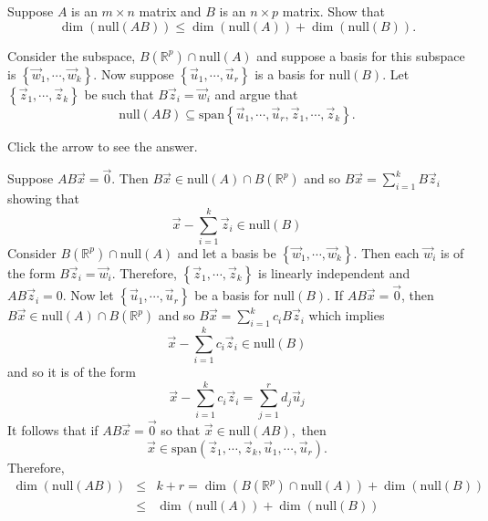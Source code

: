 \documentclass{ximera}
\begin{document}
\begin{problem}\label{prb:5.30} Suppose $A$ is an $m\times n$ matrix and $B$ is an $n\times p$ matrix.
Show that
\begin{equation*}
\dim \left( \mbox{null} \left( AB\right) \right) \leq \dim \left( \mbox{null} \left(
A\right) \right) +\dim \left( \mbox{null} \left( B\right) \right) .
\end{equation*}
\begin{hint}
Consider the subspace, $B\left( \mathbb{R}^{p}\right) \cap
\mbox{null} \left( A\right) $ and suppose a basis for this subspace is $\left\{
\vec{w}_{1},\cdots ,\vec{w}_{k}\right\} .$ Now suppose $\left\{
\vec{u}_{1},\cdots ,\vec{u}_{r}\right\} $ is a basis for $\mbox{null} \left(
B\right) .$ Let $\left\{ \vec{z}_{1},\cdots ,\vec{z}_{k}\right\} $ be
such that $B\vec{z}_{i}=\vec{w}_{i}$ and argue that
\begin{equation*}
\mbox{null} \left( AB\right) \subseteq \mbox{span}\left\{ \vec{u}_{1},\cdots ,
\vec{u}_{r},\vec{z}_{1},\cdots ,\vec{z}_{k}\right\} .
\end{equation*}

Click the arrow to see the answer.
\begin{expandable}
Suppose $AB\vec{x}=\vec{0}.$ Then $B\vec{x}\in \mbox{null}
\left( A\right) \cap B\left( \mathbb{R}^{p}\right) $ and so $B\vec{x}
=\sum_{i=1}^{k}B\vec{z}_{i}$ showing that
\[
\vec{x}-\sum_{i=1}^{k}\vec{z}_{i}\in \mbox{null} \left( B\right)
\]
Consider $B\left( \mathbb{R}^{p}\right) \cap \mbox{null} \left( A\right) $ and let
a basis be $\left\{ \vec{w}_{1},\cdots ,\vec{w}_{k}\right\} .$ Then
each $\vec{w}_{i}$ is of the form $B\vec{z}_{i}=\vec{w}_{i}$.
Therefore, $\left\{ \vec{z}_{1},\cdots ,\vec{z}_{k}\right\} $ is
linearly independent and $AB\vec{z}_{i}=0.$ Now let $\left\{ \vec{u}
_{1},\cdots ,\vec{u}_{r}\right\} $ be a basis for $\mbox{null} \left( B\right) .$
If $AB\vec{x}=\vec{0}$, then $B\vec{x} \in \mbox{null} \left( A\right) \cap B\left(
\mathbb{R}^{p}\right) $ and so $B\vec{x}=\sum_{i=1}^{k}c_{i}B\vec{z}
_{i}$ which implies
\[
\vec{x}-\sum_{i=1}^{k}c_{i}\vec{z}_{i}\in \mbox{null} \left( B\right)
\]
and so it is of the form
\[
\vec{x}-\sum_{i=1}^{k}c_{i}\vec{z}_{i}=\sum_{j=1}^{r}d_{j}\vec{u}
_{j}
\]
It follows that if $AB\vec{x}=\vec{0}$ so that $\vec{x}\in \mbox{null} \left(
AB\right) ,$ then
\[
\vec{x}\in \mbox{span}\left( \vec{z}_{1},\cdots ,\vec{z}_{k},
\vec{u}_{1},\cdots ,\vec{u}_{r}\right) .
\]
Therefore,
\begin{eqnarray*}
\dim \left( \mbox{null} \left( AB\right) \right)  &\leq &k+r=\dim \left( B\left(
\mathbb{R}^{p}\right) \cap \mbox{null} \left( A\right) \right) +\dim \left( \mbox{null}
\left( B\right) \right)  \\
&\leq &\dim \left( \mbox{null} \left( A\right) \right) +\dim \left( \mbox{null} \left(
B\right) \right)
\end{eqnarray*}
\end{expandable}
\end{hint}
\end{problem}
\end{document}
